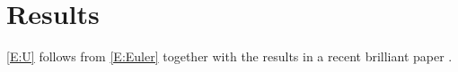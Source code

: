 \section{Results}
\autoref{E:U} follows from \autoref{E:Euler} together with the results in a recent brilliant paper \cite{Dush96b}.


